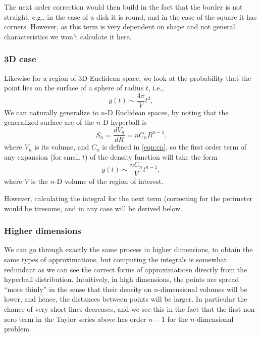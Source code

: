 The next order correction would then build in the fact that the border
is not straight, e.g., in the case of a disk it is round, and in the
case of the square it has corners. However, as this term is very
dependent on shape and not general characteristics we won't calculate
it here.




\subsubsection{3D case}

Likewise for a region of 3D Euclidean space, we look at the
probability that the point lies on the surface of a sphere of radius
$t$, i.e.,
\begin{equation}
  g(t) \sim \frac{4 \pi}{V} t^2, 
\end{equation}
We can naturally generalize to $n$-D Euclidean spaces, by noting that
the generalized surface are of the $n$-D hyperball is
\begin{equation}
  \label{eq:surface_hyperball}
  S_{n} = \frac{dV_n}{dR} = n C_n R^{n-1}.
\end{equation}
where $V_n$ is its volume, and $C_n$ is defined in \eqref{eqn:cn}, so
the first order term of any expansion (for small $t$) of the density
function will take the form
\begin{equation}
  g(t) \sim \frac{n C_n}{V} t^{n-1}, 
\end{equation}
where $V$ is the $n$-D volume of the region of interest.

However, calculating the integral for the next term (correcting for
the perimeter would be tiresome, and in any case will be derived below.

\subsubsection{Higher dimensions}

We can go through exactly the same process in higher dimensions, to
obtain the same types of approximations, but computing the integrals
is somewhat redundant as we can see the correct forms of
approximatiosn directly from the hyperball distribution. Intuitively,
in high dimensions, the points are spread ``more thinly'' in the sense
that their density on $n$-dimensional volumes will be lower, and
hence, the distances between points will be larger. In particular the
chance of very short lines decreases, and we see this in the fact that
the first non-zero term in the Taylor series above has order $n-1$ for
the $n$-dimensional problem.


